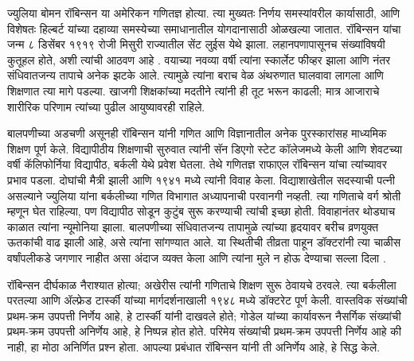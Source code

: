 \documentclass[../../../include/open-logic-section]{subfiles}
\begin{document}



ज्युलिया बोमन रॉबिन्सन या अमेरिकन गणितज्ञ होत्या. त्या मुख्यतः निर्णय समस्यांवरील कार्यासाठी, आणि विशेषतः हिल्बर्ट यांच्या दहाव्या समस्येच्या समाधानातील योगदानासाठी ओळखल्या जातात. रॉबिन्सन यांचा जन्म ८ डिसेंबर १९१९ रोजी मिसुरी राज्यातील सेंट लुईस येथे झाला. लहानपणापासूनच संख्यांविषयी कुतूहल होते, अशी त्यांची आठवण आहे \citep[4]{Reid1986}. वयाच्या नवव्या वर्षी त्यांना स्कार्लेट फीव्हर झाला आणि नंतर संधिवातजन्य तापाचे अनेक झटके आले. त्यामुळे त्यांना बराच वेळ अंथरुणात घालवावा लागला आणि शिक्षणात त्या मागे पडल्या. खाजगी शिक्षकांच्या मदतीने त्यांनी ही तूट भरून काढली; मात्र आजाराचे शारीरिक परिणाम त्यांच्या पुढील आयुष्यावरही राहिले.

बालपणीच्या अडचणी असूनही रॉबिन्सन यांनी गणित आणि विज्ञानातील अनेक पुरस्कारांसह माध्यमिक शिक्षण पूर्ण केले. विद्यापीठीय शिक्षणाची सुरुवात त्यांनी सॅन डिएगो स्टेट कॉलेजमध्ये केली आणि शेवटच्या वर्षी कॅलिफोर्निया विद्यापीठ, बर्कली येथे प्रवेश घेतला. तेथे गणितज्ञ राफाएल रॉबिन्सन यांचा त्यांच्यावर प्रभाव पडला. दोघांची मैत्री झाली आणि १९४१ मध्ये त्यांनी विवाह केला. विद्याशाखेतील सदस्याची पत्नी असल्याने ज्युलिया यांना बर्कलीच्या गणित विभागात अध्यापनाची परवानगी नव्हती. त्या गणिताचे वर्ग श्रोती म्हणून घेत राहिल्या, पण विद्यापीठ सोडून कुटुंब सुरू करण्याची त्यांची इच्छा होती. विवाहानंतर थोड्याच काळात त्यांना न्यूमोनिया झाला. बालपणीच्या संधिवातजन्य तापामुळे त्यांच्या हृदयावर बरीच व्रणयुक्त ऊतकांची वाढ झाली आहे, असे त्यांना सांगण्यात आले. या स्थितीची तीव्रता पाहून डॉक्टरांनी त्या चाळीस वर्षांपलीकडे जगणार नाहीत असा अंदाज व्यक्त केला आणि त्यांना मुले न होऊ देण्याचा सल्ला दिला \citep[13]{Reid1986}.

रॉबिन्सन दीर्घकाळ नैराश्यात होत्या; अखेरीस त्यांनी गणिताचे शिक्षण सुरू ठेवायचे ठरवले. त्या बर्कलीला परतल्या आणि ॲल्फ्रेड टार्स्की यांच्या मार्गदर्शनाखाली १९४८ मध्ये डॉक्टरेट पूर्ण केली. वास्तविक संख्यांची प्रथम-क्रम उपपत्ती निर्णेय आहे, हे टार्स्की यांनी दाखवले होते; गोडेल यांच्या कार्यावरून नैसर्गिक संख्यांची प्रथम-क्रम उपपत्ती अनिर्णेय आहे, हे निष्पन्न होत होते. परिमेय संख्यांची प्रथम-क्रम उपपत्ती निर्णेय आहे की नाही, हा मोठा अनिर्णित प्रश्न होता. आपल्या प्रबंधात \citeyearpar{Robinson1949} रॉबिन्सन यांनी ती अनिर्णेय आहे, हे सिद्ध केले.
\end{document}
